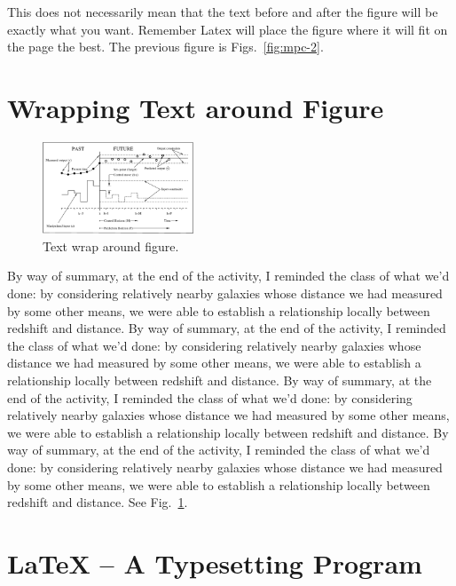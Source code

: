 \renewcommand{\baselinestretch}{2}
\large\normalsize

This does not necessarily mean that the text before and after the figure will be exactly what you want.  Remember Latex will place the figure where it will fit on the page the best.   The previous figure is Figs.~\ref{fig:mpc-2}. 

\section{Wrapping Text around Figure}


\renewcommand{\baselinestretch}{1}
\begin{figure}
\includegraphics[width=0.4\textwidth]{mpc.eps}
\caption{ Text wrap around figure. \label{fig:test}}
\end{figure}

\renewcommand{\baselinestretch}{2}
\large\normalsize

By way of summary, at the end of the activity, I reminded the class of what we'd done:  by considering relatively nearby galaxies whose distance we had measured by some other means, we were able to establish a relationship locally between redshift and distance.  
By way of summary, at the end of the activity, I reminded the class of what we'd done:  by considering relatively nearby galaxies whose distance we had measured by some other means, we were able to establish a relationship locally between redshift and distance.  
By way of summary, at the end of the activity, I reminded the class of what we'd done:  by considering relatively nearby galaxies whose distance we had measured by some other means, we were able to establish a relationship locally between redshift and distance.  
By way of summary, at the end of the activity, I reminded the class of what we'd done:  by considering relatively nearby galaxies whose distance we had measured by some other means, we were able to establish a relationship locally between redshift and distance.  See Fig.~\ref{fig:test}.


\section{LaTeX -- A Typesetting Program}

